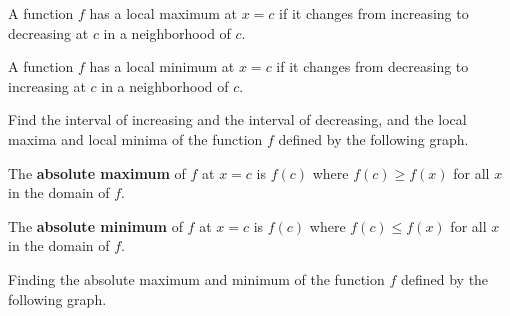 \begin{howto}
  A function $f$ has a local maximum at $x=c$ if it changes from increasing to decreasing at $c$ in a neighborhood of $c$.
  
  A function $f$ has a local minimum at $x=c$ if it changes from decreasing to increasing at $c$ in a neighborhood of $c$.
\end{howto}



\begin{example}
  Find the interval of increasing and the interval of decreasing, and the local maxima and local minima of the function $f$ defined by the following graph.


\end{example}


\begin{definition}
  The \textbf{absolute maximum} of $f$ at \(x=c\) is \(f(c)\) where \(f(c)\ge f(x)\) for all \(x\) in the domain of \(f\).
  
  The \textbf{absolute minimum} of $f$ at \(x=c\) is \(f(c)\) where \(f(c)\le f(x)\) for all \(x\) in the domain of \(f\).
\end{definition}

\begin{example}
  Finding the absolute maximum and minimum of the function $f$ defined by the following graph.
  

\end{example}

